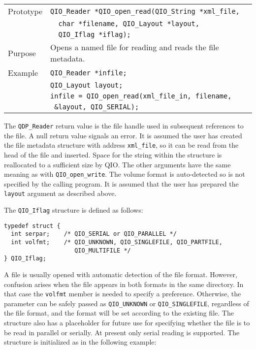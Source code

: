 \documentclass{article}
\newcommand{\QIOstring}{{\tt QIO\_String }}
\begin{document}
\begin{flushleft}
  \begin{tabular}{|l|l|}
  \hline
  Prototype      & \verb|QIO_Reader *QIO_open_read(|\QIOstring \verb|*xml_file,|\\
                 & \verb|  char *filename, QIO_Layout *layout, |\\
                 & \verb|  QIO_Iflag *iflag);|\\
  Purpose        & Opens a named file for reading and reads the file metadata. \\
\hline
  Example  & \verb|QIO_Reader *infile;| \\
           & \verb|QIO_Layout layout;| \\
           & \verb|infile = QIO_open_read(xml_file_in, filename,|\\
           & \verb| &layout, QIO_SERIAL);| \\
   \hline
 \end{tabular}
\end{flushleft}
%
The \verb|QDP_Reader| return value is the file handle used in
subsequent references to the file.  A null return value signals an
error.  It is assumed the user has created the file metadata structure
with address \verb|xml_file|, so it can be read from the head of the
file and inserted.  Space for the string within the structure is
reallocated to a sufficient size by QIO.  The other arguments have the
same meaning as with \verb|QIO_open_write|.  The volume format is
auto-detected so is not specified by the calling program.  It is
assumed that the user has prepared the \verb|layout| argument as
described above.

The \verb|QIO_Iflag| structure is defined as follows:
%
%
\begin{verbatim}
typedef struct {
  int serpar;    /* QIO_SERIAL or QIO_PARALLEL */
  int volfmt;    /* QIO_UNKNOWN, QIO_SINGLEFILE, QIO_PARTFILE, 
                    QIO_MULTIFILE */
} QIO_Iflag;
\end{verbatim}
%

A file is usually opened with automatic detection of the file format.
However, confusion arises when the file appears in both formats in the
same directory.  In that case the \verb|volfmt| member is needed to
specify a preference.  Otherwise, the parameter can be safely passed
as \verb|QIO_UNKNOWN| or \verb|QIO_SINGLEFILE|, regardless of the file
format, and the format will be set according to the existing file.
The structure also has a placeholder for future use for specifying
whether the file is to be read in parallel or serially.  At present
only serial reading is supported.  The structure is initialized as in
the following example:
\end{document}
